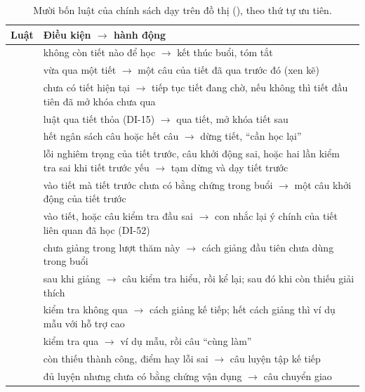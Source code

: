 \begin{table}[tp]
\centering
\caption{Mười bốn luật của chính sách dạy trên đồ thị (), theo thứ tự ưu tiên.}
\label{tab:nodepolicy}
\small
\begin{tabularx}{\linewidth}{@{}>{\raggedright\arraybackslash}p{2.6cm}Y@{}}
\toprule
Luật & Điều kiện $\rightarrow$ hành động \\
\midrule
{} & không còn tiết nào để học $\rightarrow$ kết thúc buổi, tóm tắt \\
 & vừa qua một tiết $\rightarrow$ một câu của tiết đã qua trước đó (xen kẽ) \\
 & chưa có tiết hiện tại $\rightarrow$ tiếp tục tiết đang chờ, nếu không thì tiết đầu tiên đã mở khóa chưa qua \\
 & luật qua tiết thỏa (DI-15) $\rightarrow$ qua tiết, mở khóa tiết sau \\
 & hết ngân sách câu hoặc hết câu $\rightarrow$ dừng tiết, ``cần học lại'' \\
 & lỗi nghiêm trọng của tiết trước, câu khởi động sai, hoặc hai lần kiểm tra sai khi tiết trước yếu $\rightarrow$ tạm dừng và dạy tiết trước \\
 & vào tiết mà tiết trước chưa có bằng chứng trong buổi $\rightarrow$ một câu khởi động của tiết trước \\
 & vào tiết, hoặc câu kiểm tra đầu sai $\rightarrow$ con nhắc lại ý chính của tiết liên quan đã học (DI-52) \\
 & chưa giảng trong lượt thăm này $\rightarrow$ cách giảng đầu tiên chưa dùng trong buổi \\
 & sau khi giảng $\rightarrow$ câu kiểm tra hiểu, rồi kể lại; sau đó khi còn thiếu giải thích \\
 & kiểm tra không qua $\rightarrow$ cách giảng kế tiếp; hết cách giảng thì ví dụ mẫu với hỗ trợ cao \\
 & kiểm tra qua $\rightarrow$ ví dụ mẫu, rồi câu ``cùng làm'' \\
 & còn thiếu thành công, điểm hay lỗi sai $\rightarrow$ câu luyện tập kế tiếp \\
 & đủ luyện nhưng chưa có bằng chứng vận dụng $\rightarrow$ câu chuyển giao \\
\bottomrule
\end{tabularx}
\end{table}

